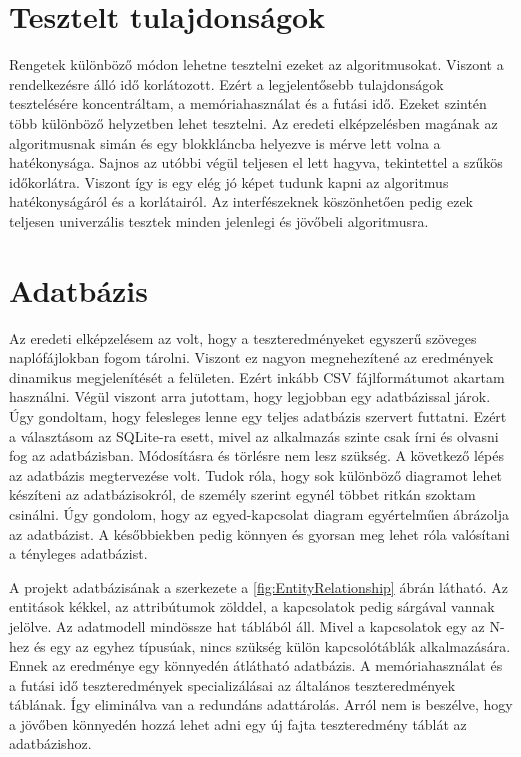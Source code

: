 \documentclass[12pt]{report} %
\begin{document}
\section{Tesztelt tulajdonságok} %

Rengetek különböző módon lehetne tesztelni ezeket az algoritmusokat. Viszont a rendelkezésre álló idő korlátozott. Ezért a legjelentősebb tulajdonságok tesztelésére koncentráltam, a memóriahasználat és a futási idő. Ezeket szintén több különböző helyzetben lehet tesztelni. Az eredeti elképzelésben magának az algoritmusnak simán és egy blokkláncba helyezve is mérve lett volna a hatékonysága. Sajnos az utóbbi végül teljesen el lett hagyva, tekintettel a szűkös időkorlátra. Viszont így is egy elég jó képet tudunk kapni az algoritmus hatékonyságáról és a korlátairól. Az interfészeknek köszönhetően pedig ezek teljesen univerzális tesztek minden jelenlegi és jövőbeli algoritmusra.

\section{Adatbázis} %

Az eredeti elképzelésem az volt, hogy a teszteredményeket egyszerű szöveges naplófájlokban fogom tárolni. Viszont ez nagyon megnehezítené az eredmények dinamikus megjelenítését a felületen. Ezért inkább CSV fájlformátumot akartam használni. Végül viszont arra jutottam, hogy legjobban egy adatbázissal járok. Úgy gondoltam, hogy felesleges lenne egy teljes adatbázis szervert futtatni. Ezért a választásom az SQLite-ra \cite{sqLite} esett, mivel az alkalmazás szinte csak írni és olvasni fog az adatbázisban. Módosításra és törlésre nem lesz szükség. A következő lépés az adatbázis megtervezése volt. Tudok róla, hogy sok különböző diagramot lehet készíteni az adatbázisokról, de személy szerint egynél többet ritkán szoktam csinálni. Úgy gondolom, hogy az egyed-kapcsolat diagram egyértelműen ábrázolja az adatbázist. A későbbiekben pedig könnyen és gyorsan meg lehet róla valósítani a tényleges adatbázist.

A projekt adatbázisának a szerkezete a \ref{fig:EntityRelationship} ábrán látható. Az entitások kékkel, az attribútumok zölddel, a kapcsolatok pedig sárgával vannak jelölve. Az adatmodell mindössze hat táblából áll. Mivel a kapcsolatok egy az N-hez és egy az egyhez típusúak, nincs szükség külön kapcsolótáblák alkalmazására. Ennek az eredménye egy könnyedén átlátható adatbázis. A memóriahasználat és a futási idő teszteredmények specializálásai az általános teszteredmények táblának. Így eliminálva van a redundáns adattárolás. Arról nem is beszélve, hogy a jövőben könnyedén hozzá lehet adni egy új fajta teszteredmény táblát az adatbázishoz.
\end{document}

